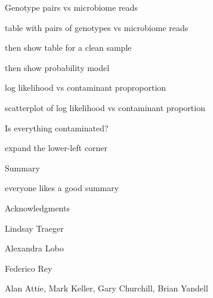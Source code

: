 \documentclass[aspectratio=169,12pt,t]{beamer}
\begin{document}
\begin{frame}[c]{Genotype pairs vs microbiome reads}

\bbi
 \item table with pairs of genotypes vs microbiome reads
 \item then show table for a clean sample
 \item then show probability model
\ei

\note{}

\end{frame}



\begin{frame}[c]{log likelihood vs contaminant proproportion}

\bbi
 \item scatterplot of log likelihood vs contaminant proportion
\ei

\note{}

\end{frame}



\begin{frame}[c]{Is everything contaminated?}

\bbi
 \item expand the lower-left corner
\ei

\note{}

\end{frame}




\begin{frame}[c]{Summary}

\bbi
 \item everyone likes a good summary
\ei

\note{}

\end{frame}




\begin{frame}[c]{Acknowledgments}

\bbi
 \item Lindsay Traeger
 \item Alexandra Lobo
 \item Federico Rey
 \item Alan Attie, Mark Keller, Gary Churchill, Brian Yandell
\ei

\note{}

\end{frame}
\end{document}
